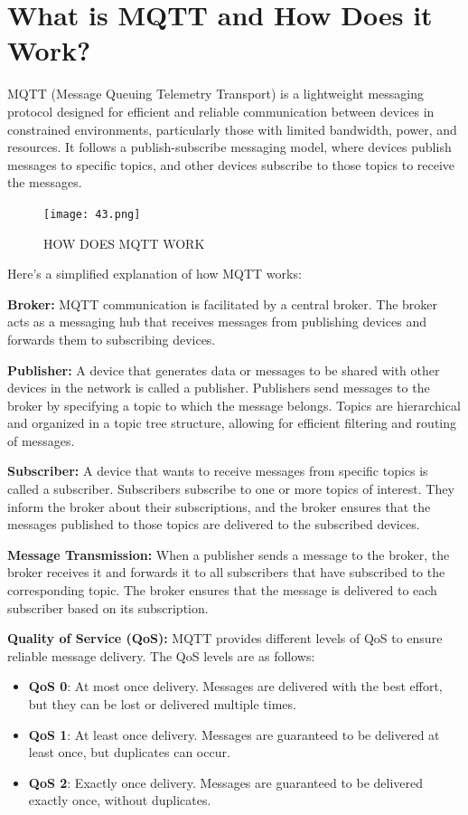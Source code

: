 \documentclass[
12pt,
oneside, 
onehalfspacing, 
nolistspacing, 
parskip, 
chapterinoneline, 
]{AASTCOMPUTER}
\begin{document}
\section{What is MQTT and How Does it Work?}
MQTT (Message Queuing Telemetry Transport) is a lightweight messaging protocol designed for efficient and reliable communication between devices in constrained environments, particularly those with limited bandwidth, power, and resources. It follows a publish-subscribe messaging model, where devices publish messages to specific topics, and other devices subscribe to those topics to receive the messages.

\begin{figure}[!ht]
\centering
\texttt{[image: 43.png]}
\caption[HOW DOES MQTT WORK]{HOW DOES MQTT WORK}
\label{fig:TCU}
\end{figure}

Here's a simplified explanation of how MQTT works:

\textbf{Broker:} MQTT communication is facilitated by a central broker. The broker acts as a messaging hub that receives messages from publishing devices and forwards them to subscribing devices.

\textbf{Publisher:} A device that generates data or messages to be shared with other devices in the network is called a publisher. Publishers send messages to the broker by specifying a topic to which the message belongs. Topics are hierarchical and organized in a topic tree structure, allowing for efficient filtering and routing of messages.

\textbf{Subscriber:} A device that wants to receive messages from specific topics is called a subscriber. Subscribers subscribe to one or more topics of interest. They inform the broker about their subscriptions, and the broker ensures that the messages published to those topics are delivered to the subscribed devices.

\textbf{Message Transmission:} When a publisher sends a message to the broker, the broker receives it and forwards it to all subscribers that have subscribed to the corresponding topic. The broker ensures that the message is delivered to each subscriber based on its subscription.

\textbf{Quality of Service (QoS):} MQTT provides different levels of QoS to ensure reliable message delivery. The QoS levels are as follows:
\begin{itemize}
  \item \textbf{QoS 0}: At most once delivery. Messages are delivered with the best effort, but they can be lost or delivered multiple times.
  \item \textbf{QoS 1}: At least once delivery. Messages are guaranteed to be delivered at least once, but duplicates can occur.
  \item \textbf{QoS 2}: Exactly once delivery. Messages are guaranteed to be delivered exactly once, without duplicates.
\end{itemize}
\end{document}
